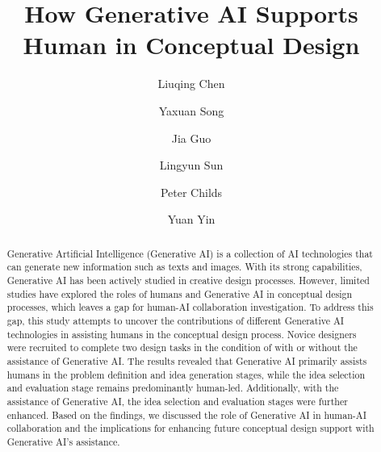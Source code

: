 \documentclass{dsj}
\begin{document}

\title{How Generative AI Supports Human in Conceptual Design}

\author[1]{Liuqing Chen}
\author[1]{Yaxuan Song}
\author[1]{Jia Guo}
\author[1]{Lingyun Sun}
\author[2]{Peter Childs}
\author[2]{Yuan Yin}

\address[1]{College of Computer science and technology, Zhejiang University, Zhejiang, China}
\address[2]{Dyson School of Design Engineering, Imperial College London, London, United Kingdom}

\maketitle

\begin{abstract}
Generative Artificial Intelligence (Generative AI) is a collection of AI technologies that can generate new information such as texts and images. With its strong capabilities, Generative AI has been actively studied in creative design processes. However, limited studies have explored the roles of humans and Generative AI in conceptual design processes, which leaves a gap for human-AI collaboration investigation. To address this gap, this study attempts to uncover the contributions of different Generative AI technologies in assisting humans in the conceptual design process. Novice designers were recruited to complete two design tasks in the condition of with or without the assistance of Generative AI. The results revealed that Generative AI primarily assists humans in the problem definition and idea generation stages, while the idea selection and evaluation stage remains predominantly human-led. Additionally, with the assistance of Generative AI, the idea selection and evaluation stages were further enhanced. Based on the findings, we discussed the role of Generative AI in human-AI collaboration and the implications for enhancing future conceptual design support with Generative AI’s assistance.

\end{abstract}
\end{document}
